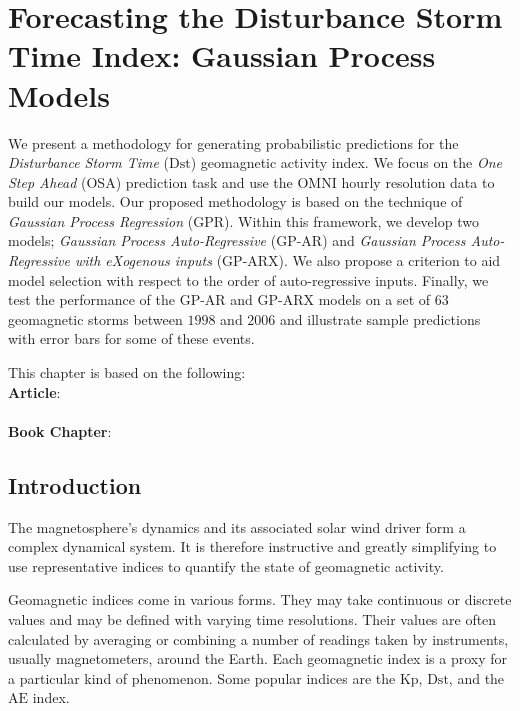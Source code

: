 \chapter{Forecasting the Disturbance Storm Time Index: Gaussian Process Models}\label{chapter:dst_osa}

{\small
    We present a methodology for generating probabilistic predictions for the 
    \emph{Disturbance Storm Time} ($\mathrm{Dst}$) geomagnetic activity index. We focus on the 
    \emph{One Step Ahead} (OSA) prediction task and use the OMNI hourly resolution data to build 
    our models. Our proposed methodology is based on the technique of 
    \emph{Gaussian Process Regression} (GPR). Within this framework, we develop two models; 
    \emph{Gaussian Process Auto-Regressive} (GP-AR) and 
    \emph{Gaussian Process Auto-Regressive with eXogenous inputs} (GP-ARX). We also propose a 
    criterion to aid model selection with respect to the order of auto-regressive inputs. 
    Finally, we test the performance of the GP-AR and GP-ARX models on a set of $63$ geomagnetic 
    storms between $1998$ and $2006$ and illustrate sample predictions with error bars for some of 
    these events.
}
        
\vfill
{}
\vfill

\noindent
    \parbox{\textwidth}{%
        {\small This chapter is based on the following:\\
        
        \textbf{Article}:\\
        \\
        
        \textbf{Book Chapter}:\\
        }
    }%

\clearpage

\section{Introduction}


The magnetosphere's dynamics and its associated solar wind driver form a complex dynamical system. 
It is therefore instructive and greatly simplifying to use representative indices to quantify the 
state of geomagnetic activity.

Geomagnetic indices come in various forms. They may take continuous or discrete values and may be 
defined with varying time resolutions. Their values are often calculated by averaging or combining 
a number of readings taken by instruments, usually magnetometers, around the Earth. Each 
geomagnetic index is a proxy for a particular kind of phenomenon. Some popular indices are the 
$\mathrm{Kp}$, $\mathrm{Dst}$, and the $\mathrm{AE}$ index.


